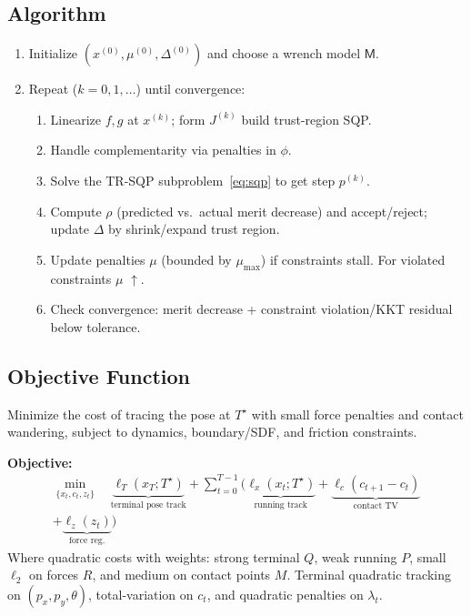 \documentclass[conference]{IEEEtran}
\begin{document}
\subsection{Algorithm}
\label{subsec:crisp-algo}
\begin{minipage}{0.98\linewidth}
\begin{enumerate}\itemsep3pt
\item Initialize $(x^{(0)},\mu^{(0)},\Delta^{(0)})$ and choose a wrench model $\mathsf M$.
\item Repeat ($k=0,1,\dots$) until convergence:
  \begin{enumerate}\itemsep2pt
  \item Linearize $f,g$ at $x^{(k)}$; form $J^{(k)}$ build trust-region SQP.
  \item Handle complementarity via penalties in $\phi$.
  \item Solve the TR-SQP subproblem~\eqref{eq:sqp} to get step $p^{(k)}$.
  \item Compute $\rho$ (predicted vs.\ actual merit decrease) and accept/reject; update $\Delta$ by shrink/expand trust region.
  \item Update penalties $\mu$ (bounded by $\mu_{\max}$) if constraints stall. For violated constraints $\mu$ $\uparrow$.
  \item Check convergence: merit decrease + constraint violation/KKT residual below tolerance.
  \end{enumerate}
\end{enumerate}
\end{minipage}

\subsection{Objective Function}
\noindent Minimize the cost of tracing the pose at $T^\star$ with small force penalties and contact wandering, subject to dynamics, boundary/SDF, and friction constraints.
\medskip

\noindent\textbf{Objective:}
\begin{align*}
\min_{\{x_t, c_t,z_t\}} \quad
    \underbrace{\ell_T(x_T;T^\star)}_{\text{terminal pose track}} 
    + \sum_{t=0}^{T-1} \Big(\underbrace{\ell_x(x_t;T^\star)}_{\text{running track}}
    + \underbrace{\ell_c( c_{t+1}- c_t)}_{\text{contact TV}} \\
    + \underbrace{\ell_z(z_t)}_{\text{force reg.}}\Big)
\end{align*}
Where quadratic costs with weights: strong terminal $Q$, weak running $P$, small $\ell_2$ on forces $R$, and medium on contact points $M$. Terminal quadratic tracking on \((p_x,p_y,\theta)\), total-variation on \(c_t\), and quadratic penalties on \(\lambda_t\).
\medskip
\end{document}
